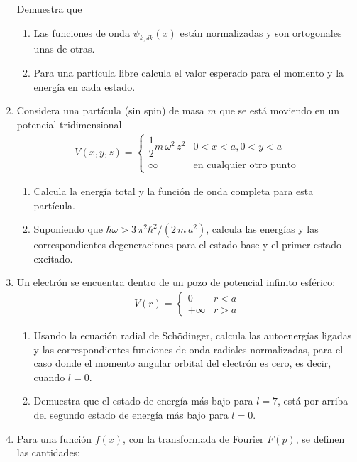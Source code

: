 \begin{enumerate}
Demuestra que
\begin{enumerate}
\item Las funciones de onda $\psi_{k, \delta k} (x)$ están normalizadas y son ortogonales unas de otras.
\item Para una partícula libre calcula el valor esperado para el momento y la energía en cada estado. 
\end{enumerate}
\item Considera una partícula (sin spin) de masa $m$ que se está moviendo en un potencial tridimensional
\begin{align*}
V(x, y, z) = \begin{cases}
\dfrac{1}{2} m \, \omega^{2} \, z^{2} & 0 < x < a, 0 < y < a \\
\infty & \mbox{en cualquier otro punto}
\end{cases}
\end{align*}
\begin{enumerate}
\item Calcula la energía total y la función de onda completa para esta partícula.
\item Suponiendo que $\hbar \omega > 3 \, \pi^{2} \hbar^{2} / (2 \, m \, a^{2})$, calcula las energías y las correspondientes degeneraciones para el estado base y el primer estado excitado.
\end{enumerate}
\item Un electrón se encuentra dentro de un pozo de potencial infinito esférico:
\begin{align*}
V(r) = \begin{cases}
0 & r < a \\
+\infty & r > a
\end{cases}
\end{align*}
\begin{enumerate}
\item Usando la ecuación radial de Schödinger, calcula las autoenergías ligadas y las correspondientes funciones de onda radiales normalizadas, para el caso donde el momento angular orbital del electrón es cero, es decir, cuando $l = 0$.
\item Demuestra que el estado de energía más bajo para $l = 7$, está por arriba del segundo estado de energía más bajo para $l = 0$.
\end{enumerate}
\item Para una función $f(x)$, con la transformada de Fourier $F(p)$, se definen las cantidades:


\end{enumerate}
